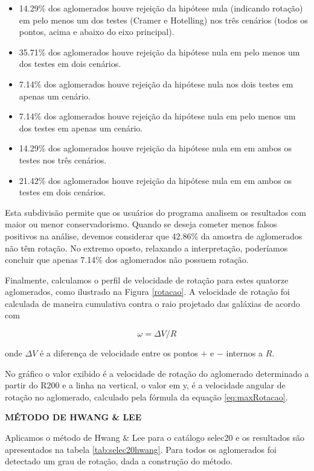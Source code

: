 \begin{itemize}
   	\item 14.29\% dos aglomerados houve rejeição da hipótese nula (indicando rotação) em pelo menos um dos testes (Cramer e Hotelling) nos três cenários (todos os pontos, acima e abaixo do eixo principal). 
   	\item 35.71\% dos aglomerados houve rejeição da hipótese nula em pelo menos um dos testes em dois cenários.
   	\item 7.14\% dos aglomerados houve rejeição da hipótese nula nos dois testes em apenas um cenário.
   	\item 7.14\% dos aglomerados houve rejeição da hipótese nula em pelo menos um dos testes em apenas um cenário.
   	\item 14.29\% dos aglomerados houve rejeição da hipótese nula em em ambos os testes nos três cenários.
   	\item 21.42\% dos aglomerados houve rejeição da hipótese nula em em ambos os testes em dois cenários.
 \end{itemize} 

\noindent Esta subdivisão permite que os usuários do programa analisem os resultados com maior ou menor conservadorismo.
Quando se deseja cometer menos falsos positivos na análise, devemos considerar que 42.86\% da amostra de aglomerados não têm rotação.
No extremo oposto, relaxando a interpretação, poderíamos concluir que apenas 7.14\% dos aglomerados não possuem rotação.

Finalmente, calculamos o perfil de velocidade de rotação para estes quatorze aglomerados, como ilustrado na Figura \ref{rotacao}. A velocidade de rotação foi calculada de maneira cumulativa contra o raio projetado das galáxias de acordo com

\begin{equation}
\omega= \Delta V/R
\label{eq:eq10}
\end{equation}

\noindent onde $\Delta V$ é a diferença de velocidade entre os pontos $+$ e $-$ internos a $R$.

No gráfico o valor exibido é a velocidade de rotação do aglomerado determinado a partir do R200 e a linha na vertical, o valor em y, é a velocidade angular de rotação no aglomerado, calculado pela fórmula da equação \ref{eq:maxRotacao}. 

\textbf{MÉTODO DE HWANG \& LEE}

Aplicamos o método de Hwang \& Lee para o catálogo selec20 e os resultados são apresentados na tabela \ref{tab:selec20hwang}. Para todos os aglomerados foi detectado um grau de rotação, dada a construção do método.

